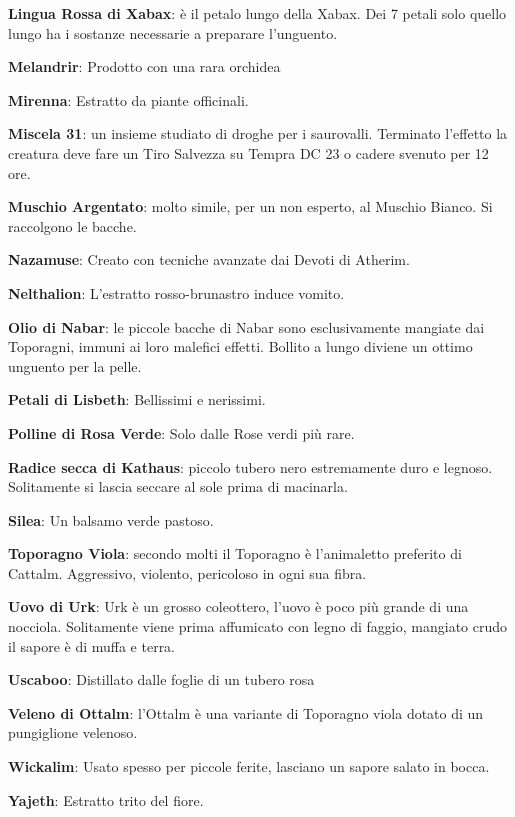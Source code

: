 \begin{multicols}{2}
\textbf{Lingua Rossa di Xabax}: è il petalo lungo della Xabax. Dei 7 petali solo quello lungo ha i sostanze necessarie a preparare l'unguento.

\textbf{Melandrir}: Prodotto con una rara orchidea

\textbf{Mirenna}: Estratto da piante officinali.

\textbf{Miscela 31}: un insieme studiato di droghe per i saurovalli. Terminato l'effetto la creatura deve fare un Tiro Salvezza su Tempra DC 23 o cadere svenuto per 12 ore.

\textbf{Muschio Argentato}: molto simile, per un non esperto, al Muschio Bianco. Si raccolgono le bacche.

\textbf{Nazamuse}: Creato con tecniche avanzate dai Devoti di Atherim.

\textbf{Nelthalion}: L'estratto rosso-brunastro induce vomito.

\textbf{Olio di Nabar}: le piccole bacche di Nabar sono esclusivamente mangiate dai Toporagni, immuni ai loro malefici effetti. Bollito a lungo diviene un ottimo unguento per la pelle.

\textbf{Petali di Lisbeth}: Bellissimi e nerissimi.

\textbf{Polline di Rosa Verde}: Solo dalle Rose verdi più rare.

\textbf{Radice secca di Kathaus}: piccolo tubero nero estremamente duro e legnoso. Solitamente si lascia seccare al sole prima di macinarla.


\textbf{Silea}: Un balsamo verde pastoso.

\textbf{Toporagno Viola}: secondo molti il Toporagno è l'animaletto preferito di Cattalm. Aggressivo, violento, pericoloso in ogni sua fibra.

\textbf{Uovo di Urk}: Urk è un grosso coleottero, l'uovo è poco più grande di una nocciola. Solitamente viene prima affumicato con legno di faggio, mangiato crudo il sapore è di muffa e terra.

\textbf{Uscaboo}: Distillato dalle foglie di un tubero rosa

\textbf{Veleno di Ottalm}: l'Ottalm è una variante di Toporagno viola dotato di un pungiglione velenoso.

\textbf{Wickalim}: Usato spesso per piccole ferite, lasciano un sapore salato in bocca.

\textbf{Yajeth}: Estratto trito del fiore.


\end{multicols}
